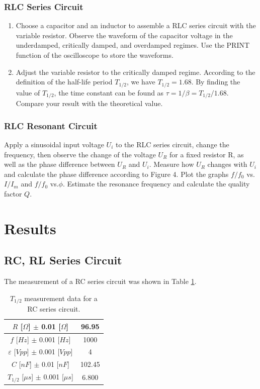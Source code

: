 \documentclass{article}
\begin{document}
\subsubsection{RLC Series Circuit}

\begin{enumerate}
\item 
Choose a capacitor and an inductor to assemble a RLC series circuit with the variable resistor. Observe the waveform of the capacitor voltage in the underdamped, critically damped, and overdamped regimes. Use the PRINT function of the oscilloscope to store the waveforms.
\item 
Adjust the variable resistor to the critically damped regime. According to the definition of the half-life period $ T_{1/2} $, we have $ T_{1/2} = 1.68 $. By finding the value of $ T_{1/2} $, the time constant can be found as $ \tau = 1/\beta = T_{1/2}/1.68 $. Compare your result with the theoretical value.
\end{enumerate}

\subsubsection{RLC Resonant Circuit}
Apply a sinusoidal input voltage $ U_i $ to the RLC series circuit, change the frequency, then observe the change of the voltage $ U_R $ for a fixed resistor R, as well as the phase difference between $ U_R $ and $ U_i $. Measure how $ U_R $ changes with $ U_i $ and calculate the phase difference according to Figure 4. Plot the graphs $ f/f_0 $ vs. $ I/I_m $ and $ f/f_0 $ vs.$ \phi $. Estimate the resonance frequency and calculate the quality factor $ Q $.



\section{Results}

\subsection{RC, RL Series Circuit}

The measurement of a RC series circuit was shown in Table \ref{tab-1}.

\begin{table}[!h]
\begin{center}
\begin{tabular}{|c|c|}
\hline
$R$ [$\Omega$] $\pm$ 0.01 [$\Omega$]	&	96.95	\\
\hline
$f$ [$Hz$] $\pm$ 0.001 [$Hz$]	&	1000	\\
\hline
$\varepsilon$ [$Vpp$] $\pm$ 0.001 [$Vpp$]	&	4	\\
\hline
$C$ [$nF$] $\pm$ 0.01 [$nF$]	&	102.45	\\
\hline
$T_{1/2}$ [$\mu s$] $\pm$ 0.001 [$\mu s$]	&	6.800	\\
\hline
\end{tabular}
\caption{$T_{1/2}$ measurement data for a RC series circuit.}
\label{tab-1}
\end{center}
\end{table}
\end{document}
